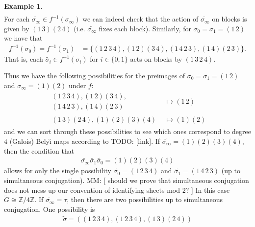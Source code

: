 \documentclass[oneside, reqno, 12pt]{amsart}
\theoremstyle{definition}
\newtheorem{example} [thm] {Example}
\theoremstyle{remark}
\newcommand{\Z}{\mathbb Z}
\newcommand{\wt}{\widetilde}
\newcommand{\mm}[1]{{\color{blue} \sf MM: [#1]}}
\newcommand{\todo}[1]{{\color{red} \sf TODO: [#1]}}
\newcommand{\Belyi}{Bely\u{\i} }
\begin{document}
{{\begin{example}
\begin{align*}
      \end{align*}
      For each $\wt{\sigma_\infty}\in f^{-1}(\sigma_\infty)$
      we can indeed check that the action
      of $\wt{\sigma_\infty}$
      on blocks is given by
      $\left(\boxed{1\,3}\right)\left(\boxed{2\,4}\right)$
      (i.e. $\wt{\sigma_\infty}$ fixes each block).
      Similarly,
      for $\sigma_0 = \sigma_1 = (1\,2)$ we have that
      \begin{align*}
        f^{-1}(\sigma_0) = f^{-1}(\sigma_1) &=
        \{(1\,2\,3\,4), (1\,2)(3\,4), (1\,4\,2\,3), (1\,4)(2\,3)\}.
      \end{align*}
      That is,
      each $\wt{\sigma_i}\in f^{-1}(\sigma_i)$ for $i\in\{0,1\}$
      acts on blocks by
      $\left(\boxed{1\,3}\,\boxed{2\,4}\right)$.
      \par
      Thus we have the following possibilities for the
      preimages of
      $\sigma_0=\sigma_1=(1\,2)$ and $\sigma_\infty = (1)(2)$
      under $f$:
      \begin{align*}
        \begin{matrix}
          (1\,2\,3\,4), (1\,2)(3\,4),\\
          (1\,4\,2\,3), (1\,4)(2\,3)
        \end{matrix}
        &\mapsto
        (1\,2)\\
        \begin{matrix}
          (1\,3)(2\,4), (1)(2)(3)(4)
        \end{matrix}
        &\mapsto
        (1)(2)
      \end{align*}
      and we can sort through these possibilities to
      see which ones correspond to degree $4$ (Galois) \Belyi maps
      according to \todo{link}.
      If $\wt{\sigma_\infty} = (1)(2)(3)(4)$,
      then the condition that
      \begin{align*}
        \wt{\sigma_\infty}\wt{\sigma_1}\wt{\sigma_0} = (1)(2)(3)(4)
      \end{align*}
      allows for only
      the single possibility
      $\wt{\sigma_0} = (1\,2\,3\,4)$
      and $\wt{\sigma_1} = (1\,4\,2\,3)$
      (up to simultaneous conjugation).
      \mm{
        should we prove that simultaneous conjugation
        does not mess up our convention of identifying
        sheets mod 2?
      }
      In this case $\wt{G}\cong\Z/4\Z$.
      If $\wt{\sigma_\infty} = \tau$,
      then there are two possibilities up to simultaneous conjugation.
      One possibility is
      \begin{align*}
        \wt{\sigma} = \left( (1\,2\,3\,4), (1\,2\,3\,4), (1\,3)(2\,4) \right)

\end{align*}
\end{example}}}
\end{document}
